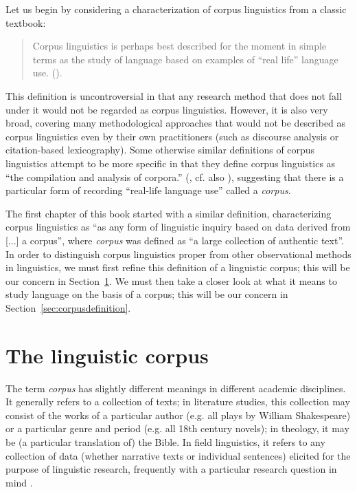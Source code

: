 Let us begin by considering a characterization of corpus linguistics from a classic textbook:

\begin{quotation}
Corpus linguistics is perhaps best described for the moment in simple terms as the study of language based on examples of ``real life'' language use. (\citealt[1]{mcenery_corpus_2001}).
\end{quotation}

This definition is uncontroversial in that any research method that does not fall under it would not be regarded as corpus linguistics. However, it is also very broad, covering many methodological approaches that would not be described as corpus linguistics even by their own practitioners (such as discourse analysis or citation\hyp{}based lexicography). Some otherwise similar definitions of corpus linguistics attempt to be more specific in that they define corpus linguistics as ``the compilation and analysis of corpora.'' (\citealt[6]{cheng_exploring_2012}, cf. also \citealt[xi]{meyer_english_2002}), suggesting that there is a particular form of recording ``real\hyp{}life language use'' called a \emph{corpus}.

The first chapter of this book started with a similar definition, characterizing corpus linguistics as ``as any form of linguistic inquiry based on data derived from [...] a corpus'', where \emph{corpus} was defined as ``a large  collection of authentic  text''. In order to distinguish corpus linguistics proper from other observational  methods in linguistics, we must first refine this definition of a linguistic corpus; this will be our concern in Section~\ref{sec:linguisticcorpus}. We must then take a closer look at what it means to study language on the basis of a corpus; this will be our concern in Section~\ref{sec:corpusdefinition}.

\section{The linguistic corpus}\label{sec:linguisticcorpus}

The term \emph{corpus} has slightly different meanings  in different academic disciplines. It generally refers to a collection of texts; in literature  studies, this collection may consist of the works of a particular author (e.g. all plays by William Shakespeare) or a particular genre  and period (e.g. all 18th century novels); in theology, it may be (a particular translation of) the Bible. In field linguistics, it refers to any collection of data (whether narrative texts or individual sentences) elicited  for the purpose of linguistic research, frequently with a particular research question in mind \citep[cf.][769]{sebba_corpora_1994}.

